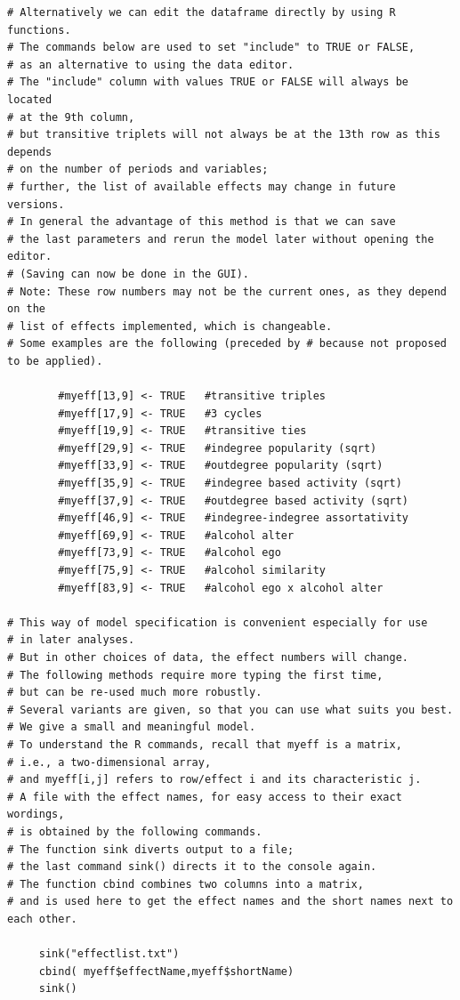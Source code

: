 \documentclass[a4paper,fleqn]{article}
\newcommand{\+}{\, + \,}
\begin{document}
{\begin{verbatim}
# Alternatively we can edit the dataframe directly by using R functions.
# The commands below are used to set "include" to TRUE or FALSE,
# as an alternative to using the data editor.
# The "include" column with values TRUE or FALSE will always be located
# at the 9th column,
# but transitive triplets will not always be at the 13th row as this depends
# on the number of periods and variables;
# further, the list of available effects may change in future versions.
# In general the advantage of this method is that we can save
# the last parameters and rerun the model later without opening the editor.
# (Saving can now be done in the GUI).
# Note: These row numbers may not be the current ones, as they depend on the
# list of effects implemented, which is changeable.
# Some examples are the following (preceded by # because not proposed to be applied).

        #myeff[13,9] <- TRUE   #transitive triples
        #myeff[17,9] <- TRUE   #3 cycles
        #myeff[19,9] <- TRUE   #transitive ties
        #myeff[29,9] <- TRUE   #indegree popularity (sqrt)
        #myeff[33,9] <- TRUE   #outdegree popularity (sqrt)
        #myeff[35,9] <- TRUE   #indegree based activity (sqrt)
        #myeff[37,9] <- TRUE   #outdegree based activity (sqrt)
        #myeff[46,9] <- TRUE   #indegree-indegree assortativity
        #myeff[69,9] <- TRUE   #alcohol alter
        #myeff[73,9] <- TRUE   #alcohol ego
        #myeff[75,9] <- TRUE   #alcohol similarity
        #myeff[83,9] <- TRUE   #alcohol ego x alcohol alter

# This way of model specification is convenient especially for use
# in later analyses.
# But in other choices of data, the effect numbers will change.
# The following methods require more typing the first time,
# but can be re-used much more robustly.
# Several variants are given, so that you can use what suits you best.
# We give a small and meaningful model.
# To understand the R commands, recall that myeff is a matrix,
# i.e., a two-dimensional array,
# and myeff[i,j] refers to row/effect i and its characteristic j.
# A file with the effect names, for easy access to their exact wordings,
# is obtained by the following commands.
# The function sink diverts output to a file;
# the last command sink() directs it to the console again.
# The function cbind combines two columns into a matrix,
# and is used here to get the effect names and the short names next to each other.

     sink("effectlist.txt")
     cbind( myeff$effectName,myeff$shortName)
     sink()


\end{verbatim}}
\end{document}
